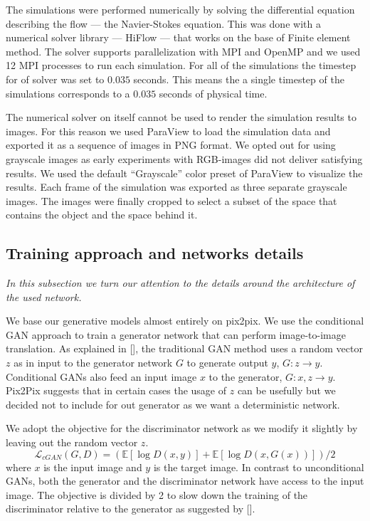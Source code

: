 \documentclass{llncs}
\begin{document}
The simulations were performed numerically by solving the differential equation describing the flow --- the Navier-Stokes equation. This was done with a numerical solver library --- HiFlow ---  that works on the base of Finite element method. The solver supports parallelization with MPI and OpenMP and we used 12 MPI processes to run each simulation. For all of the simulations the timestep for of solver was set to $0.035$ seconds. This means the a single timestep of the simulations corresponds to a $0.035$ seconds of physical time.

The numerical solver on itself cannot be used to render the simulation results to images. For this reason we used ParaView to load the simulation data and exported it as a sequence of images in PNG format. We opted out for using grayscale images as early experiments with RGB-images did not deliver satisfying results. We used the default ``Grayscale'' color preset of ParaView to visualize the results. Each frame of the simulation was exported as three separate grayscale images. The images were finally cropped to select a subset of the space that contains the object and the space behind it.

\subsection{Training approach and networks details}
\emph{In this subsection we turn our attention to the details around the architecture of the used network.}

We base our generative models almost entirely on pix2pix. We use the conditional GAN approach to train a generator network that can perform image-to-image translation. As explained in [], the traditional GAN method uses a random vector $z$ as in input to the generator network $G$ to generate output $y$, $G:z \rightarrow y$. Conditional GANs also feed an input image $x$ to the generator, $G: x,z \rightarrow y$. Pix2Pix suggests that in certain cases the usage of $z$ can be usefully but we decided not to include for out generator as we want a deterministic network.

We adopt the objective for the discriminator network as we modify it slightly by leaving out the random vector $z$.
\begin{equation}
\mathcal{L}_{cGAN} (G, D) = (\mathbb{E}[\log D (x,y)] + \mathbb{E}[\log D (x, G(x))])/2
\end{equation}
where $x$ is the input image and $y$ is the target image. In contrast to unconditional GANs, both the generator and the discriminator network have access to the input image. The objective is divided by 2 to slow down the training of the discriminator relative to the generator as suggested by [].
\end{document}
